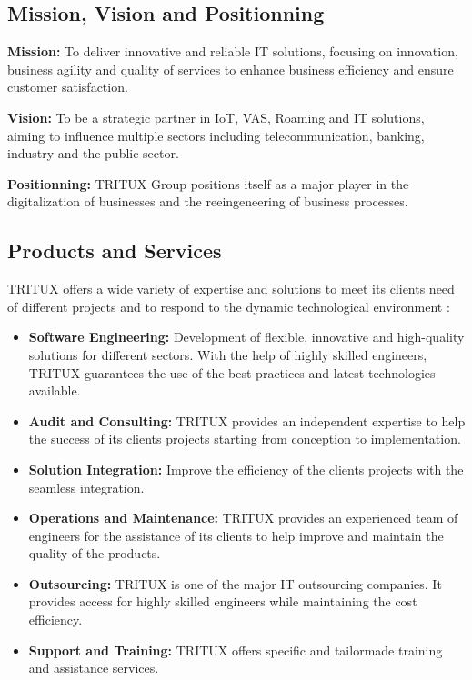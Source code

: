 \documentclass[11pt, a4paper]{report}
\begin{document}
          \subsection{Mission, Vision and Positionning} 
          
            \textbf{Mission:} To deliver innovative and reliable IT solutions, focusing on innovation, business agility and quality of services to enhance business efficiency and ensure customer satisfaction.

            \noindent \textbf{Vision:} To be a strategic partner in IoT, VAS, Roaming and IT solutions, aiming to influence multiple sectors including telecommunication, banking, industry and the public sector.

            \noindent \textbf{Positionning:} TRITUX Group positions itself as a major player in the digitalization of businesses and the reeingeneering of business processes.
          \subsection{Products and Services}
            TRITUX offers a wide variety of expertise and solutions to meet its clients need of different projects and to respond to the dynamic technological environment :
            \begin{itemize}
              \item \textbf{Software Engineering:} Development of flexible, innovative and high-quality solutions for different sectors. With the help of highly skilled engineers, TRITUX guarantees the use of the best practices and latest technologies available.
              \item \textbf{Audit and Consulting:} TRITUX provides an independent expertise to help the success of its clients projects starting from conception to implementation.
            \end{itemize}
    \newpage
      \thispagestyle{plain}
      \begin{itemize}
        \item \textbf{Solution Integration:} Improve the efficiency of the clients projects with the seamless integration.
        \item \textbf{Operations and Maintenance:} TRITUX provides an experienced team of engineers for the assistance of its clients to help improve and maintain the quality of the products.
        \item \textbf{Outsourcing:} TRITUX is one of the major IT outsourcing companies. It provides access for highly skilled engineers while maintaining the cost efficiency.
        \item \textbf{Support and Training:} TRITUX offers specific and tailormade training and assistance services.     
      \end{itemize}
\end{document}
